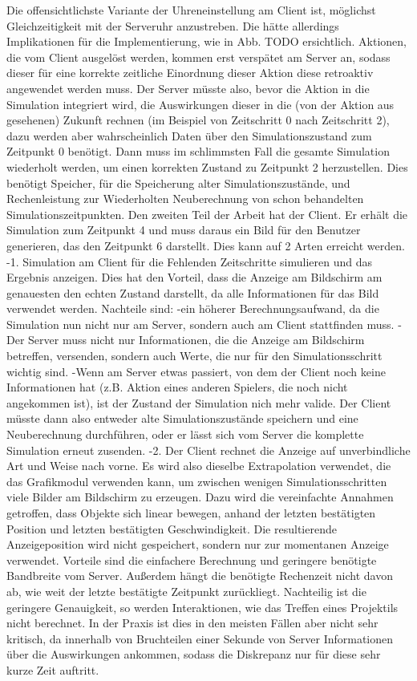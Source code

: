 Die offensichtlichste Variante der Uhreneinstellung am Client ist, möglichst Gleichzeitigkeit mit der Serveruhr anzustreben. Die hätte allerdings Implikationen für die Implementierung, wie in Abb. TODO ersichtlich. Aktionen, die vom Client ausgelöst werden, kommen erst verspätet am Server an, sodass dieser für eine korrekte zeitliche Einordnung dieser Aktion diese retroaktiv angewendet werden muss. Der Server müsste also, bevor die Aktion in die Simulation integriert wird, die Auswirkungen dieser in die (von der Aktion aus gesehenen) Zukunft rechnen (im Beispiel von Zeitschritt 0 nach Zeitschritt 2), dazu werden aber wahrscheinlich Daten über den Simulationszustand zum Zeitpunkt 0 benötigt. Dann muss im schlimmsten Fall die gesamte Simulation wiederholt werden, um einen korrekten Zustand zu Zeitpunkt 2 herzustellen. Dies benötigt Speicher, für die Speicherung alter Simulationszustände, und Rechenleistung zur Wiederholten Neuberechnung von schon behandelten Simulationszeitpunkten. Den zweiten Teil der Arbeit hat der Client. Er erhält die Simulation zum Zeitpunkt 4 und muss daraus ein Bild für den Benutzer generieren, das den Zeitpunkt 6 darstellt. Dies kann auf 2 Arten erreicht werden.
-1. Simulation am Client für die Fehlenden Zeitschritte simulieren und das Ergebnis anzeigen. Dies hat den Vorteil, dass die Anzeige am Bildschirm am genauesten den echten Zustand darstellt, da alle Informationen für das Bild verwendet werden. Nachteile sind: 
 -ein höherer Berechnungsaufwand, da die Simulation nun nicht nur am Server, sondern auch am Client stattfinden muss. 
 -Der Server muss nicht nur Informationen, die die Anzeige am Bildschirm betreffen, versenden, sondern auch Werte, die nur für den Simulationsschritt wichtig sind.
 -Wenn am Server etwas passiert, von dem der Client noch keine Informationen hat (z.B. Aktion eines anderen Spielers, die noch nicht angekommen ist), ist der Zustand der Simulation nich mehr valide. Der Client müsste dann also entweder alte Simulationszustände speichern und eine Neuberechnung durchführen, oder er lässt sich vom Server die komplette Simulation erneut zusenden.
-2. Der Client rechnet die Anzeige auf unverbindliche Art und Weise nach vorne. Es wird also dieselbe Extrapolation verwendet, die das Grafikmodul verwenden kann, um zwischen wenigen Simulationsschritten viele Bilder am Bildschirm zu erzeugen. Dazu wird die vereinfachte Annahmen getroffen, dass Objekte sich linear bewegen, anhand der letzten bestätigten Position und letzten bestätigten Geschwindigkeit. Die resultierende Anzeigeposition wird nicht gespeichert, sondern nur zur momentanen Anzeige verwendet. Vorteile sind die einfachere Berechnung und geringere benötigte Bandbreite vom Server. Außerdem hängt die benötigte Rechenzeit nicht davon ab, wie weit der letzte bestätigte Zeitpunkt zurückliegt. Nachteilig ist die geringere Genauigkeit, so werden Interaktionen, wie das Treffen eines Projektils nicht berechnet. In der Praxis ist dies in den meisten Fällen aber nicht sehr kritisch, da innerhalb von Bruchteilen einer Sekunde von Server Informationen über die Auswirkungen ankommen, sodass die Diskrepanz nur für diese sehr kurze Zeit auftritt.

